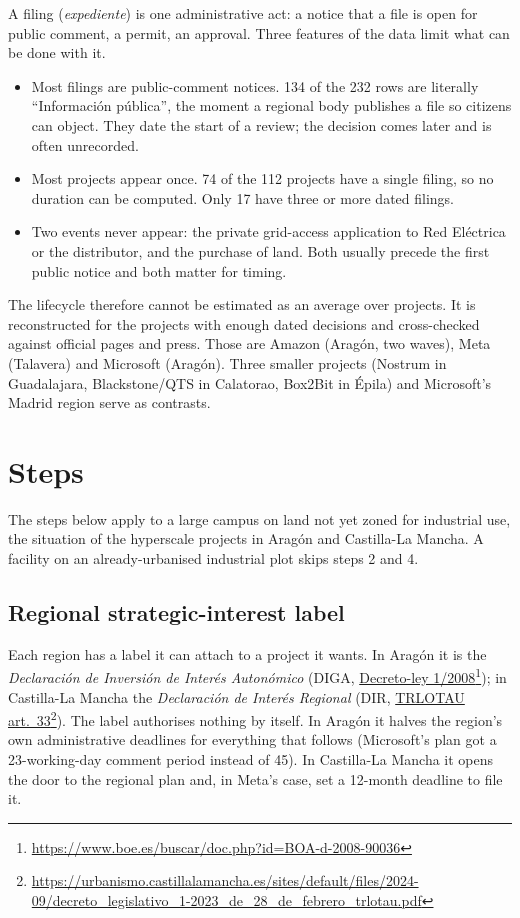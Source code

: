 \documentclass[11pt]{article}
\newcommand{\src}[2]{\href{#1}{#2}\footnote{\url{#1}}}
\begin{document}
A filing (\emph{expediente}) is one administrative act: a notice that a file is open for public comment, a permit, an approval. Three features of the data limit what can be done with it.

\begin{itemize}[leftmargin=*]
\item Most filings are public-comment notices. 134 of the 232 rows are literally ``Información pública'', the moment a regional body publishes a file so citizens can object. They date the start of a review; the decision comes later and is often unrecorded.
\item Most projects appear once. 74 of the 112 projects have a single filing, so no duration can be computed. Only 17 have three or more dated filings.
\item Two events never appear: the private grid-access application to Red Eléctrica or the distributor, and the purchase of land. Both usually precede the first public notice and both matter for timing.
\end{itemize}

The lifecycle therefore cannot be estimated as an average over projects. It is reconstructed for the projects with enough dated decisions and cross-checked against official pages and press. Those are Amazon (Aragón, two waves), Meta (Talavera) and Microsoft (Aragón). Three smaller projects (Nostrum in Guadalajara, Blackstone/QTS in Calatorao, Box2Bit in Épila) and Microsoft's Madrid region serve as contrasts.

\section{Steps}

The steps below apply to a large campus on land not yet zoned for industrial use, the situation of the hyperscale projects in Aragón and Castilla-La Mancha. A facility on an already-urbanised industrial plot skips steps 2 and 4.

\subsection{Regional strategic-interest label}

Each region has a label it can attach to a project it wants. In Aragón it is the \emph{Declaración de Inversión de Interés Autonómico} (DIGA, \src{https://www.boe.es/buscar/doc.php?id=BOA-d-2008-90036}{Decreto-ley 1/2008}); in Castilla-La Mancha the \emph{Declaración de Interés Regional} (DIR, \src{https://urbanismo.castillalamancha.es/sites/default/files/2024-09/decreto_legislativo_1-2023_de_28_de_febrero_trlotau.pdf}{TRLOTAU art.~33}). The label authorises nothing by itself. In Aragón it halves the region's own administrative deadlines for everything that follows (Microsoft's plan got a 23-working-day comment period instead of 45). In Castilla-La Mancha it opens the door to the regional plan and, in Meta's case, set a 12-month deadline to file it.
\end{document}
